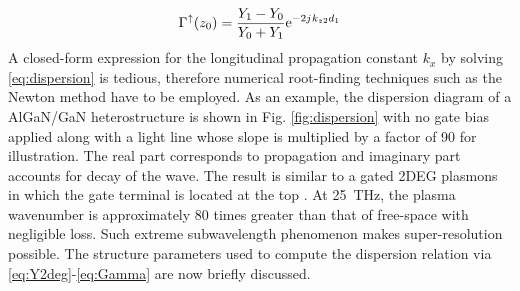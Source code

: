 \documentclass[11pt]{article}
\begin{document}
%
\begin{equation}
  \Gamma^{\uparrow}(z_0) = \frac{Y_1 - Y_0}{Y_0 + Y_1} \mathrm{e}^{-2j\mkern1mu k_{z2}d_1}
  \label{eq:Gamma}
\end{equation}
%
A closed-form expression for the longitudinal propagation constant $k_x$ by solving \eqref{eq:dispersion} is tedious, therefore numerical root-finding techniques such as the Newton method \cite{9780521880688} have to be employed. As an example, the dispersion diagram of a AlGaN/GaN heterostructure is shown in Fig. \ref{fig:dispersion} with no gate bias applied along with a light line whose slope is multiplied by a factor of 90 for illustration. The real part corresponds to propagation and imaginary part accounts for decay of the wave. The result is similar to a gated 2DEG plasmons in which the gate terminal is located at the top \cite{Nakayama1974, Eguiluz1975}. At \SI{25}{\THz}, the plasma wavenumber is approximately 80 times greater than that of free-space with negligible loss. Such extreme subwavelength phenomenon makes super-resolution possible. The structure parameters used to compute the dispersion relation via \eqref{eq:Y2deg}-\eqref{eq:Gamma} are now briefly discussed.
\end{document}
